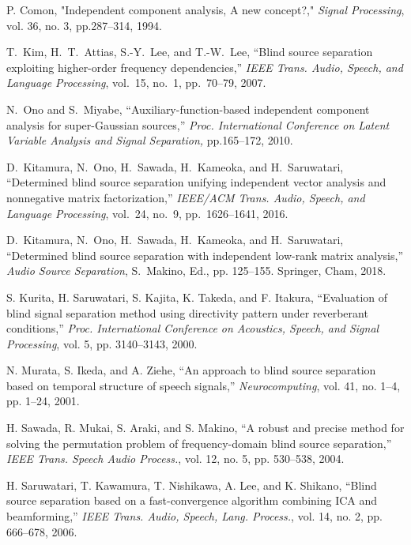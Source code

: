 \documentclass[10.5pt]{jarticle}
\begin{document}
\begin{thebibliography}{99}
\itemsep 1pt %
\fontsize{8pt}{8pt}\selectfont  %

P. Comon, "Independent component analysis, A new concept?," {\em Signal Processing}, vol. 36, no. 3, pp.287--314, 1994.

T.~Kim, H.~T.~Attias, S.-Y.~Lee, and T.-W.~Lee, ``Blind source separation exploiting higher-order frequency dependencies,'' 
{\em IEEE Trans. Audio, Speech, and Language Processing}, vol.~15, no.~1, pp.~70--79, 2007.

N.~Ono and S.~Miyabe, ``Auxiliary-function-based independent component analysis for super-Gaussian sources,'' 
{\em Proc. International Conference on Latent Variable Analysis and Signal Separation,} pp.165--172, 2010.

D.~Kitamura, N.~Ono, H.~Sawada, H.~Kameoka, and H.~Saruwatari,
``Determined blind source separation unifying independent vector analysis and nonnegative matrix factorization,'' 
{\em IEEE/ACM Trans. Audio, Speech, and Language Processing}, vol.~24, no.~9, pp.~1626--1641, 2016.

D.~Kitamura, N.~Ono, H.~Sawada, H.~Kameoka, and H.~Saruwatari, ``Determined blind source separation with independent low-rank matrix analysis,'' 
{\em Audio Source Separation}, S.~Makino, Ed., pp. 125--155. Springer, Cham, 2018.

S. Kurita, H. Saruwatari, S. Kajita, K. Takeda, and F. Itakura, ``Evaluation of blind signal separation method using directivity pattern under reverberant conditions,'' {\em Proc. International Conference on Acoustics, Speech, and Signal Processing}, vol. 5, pp. 3140--3143, 2000.

N. Murata, S. Ikeda, and A. Ziehe, ``An approach to blind source separation based on temporal structure of speech signals,'' {\em Neurocomputing}, vol. 41, no. 1--4, pp. 1--24, 2001.

H. Sawada, R. Mukai, S. Araki, and S. Makino, ``A robust and precise method for solving the permutation problem of frequency-domain blind source separation,'' {\em IEEE Trans. Speech Audio Process.}, vol. 12, no. 5, pp. 530--538, 2004.

H. Saruwatari, T. Kawamura, T. Nishikawa, A. Lee, and K. Shikano, ``Blind source separation based on a fast-convergence algorithm combining ICA and beamforming,'' {\em IEEE Trans. Audio, Speech, Lang. Process.}, vol. 14, no. 2, pp. 666--678, 2006.


\end{thebibliography}
\end{document}
